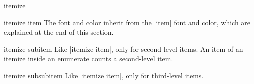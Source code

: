 \begin{environment}{{itemize}}
\begin{element}{itemize item}
    The font and color inherit from the |item| font and color, which
    are explained at the end of this section.
  \end{element}

  \begin{element}{itemize subitem}\yes\yes\yes
    Like |itemize item|, only for second-level items. An
    item of an itemize inside an enumerate counts a second-level item.
  \end{element}

  \begin{element}{itemize subsubitem}\yes\yes\yes
    Like |itemize item|, only for third-level items.
  \end{element}
\end{environment}




